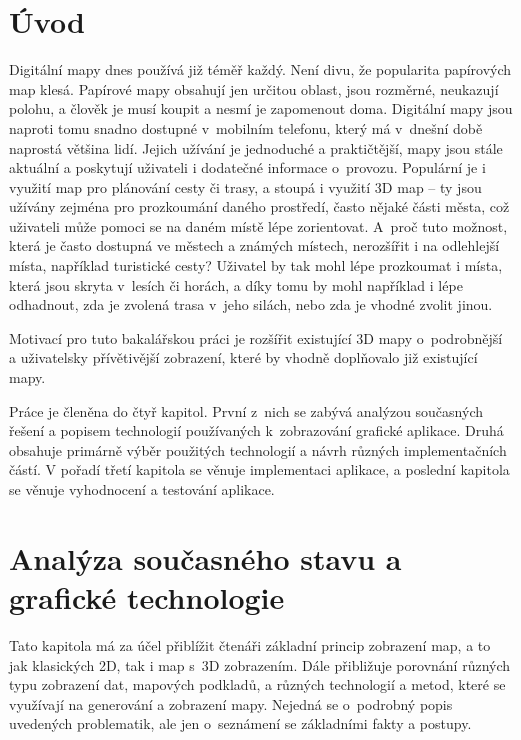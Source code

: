\chapter{Úvod}

Digitální mapy dnes používá již téměř každý. Není divu, že popularita papírových map klesá. Papírové mapy obsahují jen určitou oblast, jsou rozměrné, neukazují polohu, a člověk je musí koupit a nesmí je zapomenout doma. Digitální mapy jsou naproti tomu snadno dostupné v~mobilním telefonu, který má v~dnešní době naprostá většina lidí. Jejich užívání je jednoduché a praktičtější, mapy jsou stále aktuální a poskytují uživateli i dodatečné informace o~provozu. Populární je i využití map pro plánování cesty či trasy, a stoupá i využití 3D map -- ty jsou užívány zejména pro prozkoumání daného prostředí, často nějaké části města, což uživateli může pomoci se na daném místě lépe zorientovat.
A~proč tuto možnost, která je často dostupná ve městech a známých místech, nerozšířit i na odlehlejší místa, například turistické cesty? Uživatel by tak mohl lépe prozkoumat i místa, která jsou skryta v~lesích či horách, a díky tomu by mohl například i lépe odhadnout, zda je zvolená trasa v~jeho silách, nebo zda je vhodné zvolit jinou.

Motivací pro tuto bakalářskou práci je rozšířit existující 3D mapy o~podrobnější a uživatelsky přívětivější zobrazení, které by vhodně doplňovalo již existující mapy. 


Práce je členěna do čtyř kapitol. První z~nich se zabývá analýzou současných řešení a popisem technologií používaných k~zobrazování grafické aplikace. Druhá obsahuje primárně výběr použitých technologií a návrh různých implementačních částí. V pořadí třetí kapitola se věnuje implementaci aplikace, a poslední kapitola se věnuje vyhodnocení a testování aplikace.

 
\chapter{Analýza současného stavu a grafické technologie}

\label{Teorie}
Tato kapitola má za účel přiblížit čtenáři základní princip zobrazení map, a to jak klasických 2D, tak i map s~3D zobrazením. Dále přibližuje porovnání různých typu zobrazení dat, mapových podkladů, a různých technologií a metod, které se využívají na generování a zobrazení mapy.
Nejedná se o~podrobný popis uvedených problematik, ale jen o~seznámení se základními fakty a postupy.

